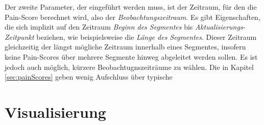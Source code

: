 Der zweite Parameter, der eingeführt werden muss, ist der Zeitraum, für den die Pain-Score berechnet wird, also der \emph{Beobachtungszeitraum}. Es gibt Eigenschaften, die sich implizit auf den Zeitraum \emph{Beginn des Segmentes} bis \emph{Aktualisierungs-Zeitpunkt} beziehen, wie beispielsweise die \emph{Länge des Segmentes}. Dieser Zeitraum gleichzeitig der längst mögliche Zeitraum innerhalb eines Segmentes, insofern keine Pain-Scores über mehrere Segmente hinweg abgeleitet werden sollen. Es ist jedoch auch möglich, kürzere Beobachtugnszeiträume zu wählen. Die in Kapitel \ref{sec:painScores} geben wenig Aufschluss über \glqq typische 

\section{Visualisierung}
\label{sec:visualisation}